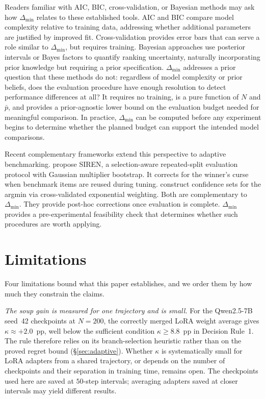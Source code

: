 \documentclass[pdflatex,sn-mathphys-ay,iicol]{sn-jnl}
\theoremstyle{thmstylethree}
\begin{document}
\begin{table}[t]
\begin{table}[t]
Readers familiar with AIC, BIC, cross-validation, or Bayesian methods may ask how $\Delta_{\min}$ relates to these established tools. AIC and BIC compare model complexity relative to training data, addressing whether additional parameters are justified by improved fit. Cross-validation provides error bars that can serve a role similar to $\Delta_{\min}$, but requires training. Bayesian approaches use posterior intervals or Bayes factors to quantify ranking uncertainty, naturally incorporating prior knowledge but requiring a prior specification. $\Delta_{\min}$ addresses a prior question that these methods do not: regardless of model complexity or prior beliefs, does the evaluation procedure have enough resolution to detect performance differences at all? It requires no training, is a pure function of $N$ and $\bar{p}$, and provides a prior-agnostic lower bound on the evaluation budget needed for meaningful comparison. In practice, $\Delta_{\min}$ can be computed before any experiment begins to determine whether the planned budget can support the intended model comparisons.

Recent complementary frameworks extend this perspective to adaptive benchmarking. \citet{xu2026b} propose SIREN, a selection-aware repeated-split evaluation protocol with Gaussian multiplier bootstrap. It corrects for the winner's curse when benchmark items are reused during tuning. \citet{zhang2024winners} construct confidence sets for the argmin via cross-validated exponential weighting. Both are complementary to $\Delta_{\min}$. They provide post-hoc corrections once evaluation is complete. $\Delta_{\min}$ provides a pre-experimental feasibility check that determines whether such procedures are worth applying.

\section{Limitations}\label{sec:limitations}

Four limitations bound what this paper establishes, and we order them by how much they constrain the claims.

\emph{The soup gain is measured for one trajectory and is small.} For the Qwen2.5-7B seed~42 checkpoints at $N=200$, the correctly merged LoRA weight average gives $\kappa \approx +2.0$~pp, well below the sufficient condition $\kappa \geq 8.8$~pp in Decision Rule~1. The rule therefore relies on its branch-selection heuristic rather than on the proved regret bound (\S\ref{sec:adaptive}). Whether $\kappa$ is systematically small for LoRA adapters from a shared trajectory, or depends on the number of checkpoints and their separation in training time, remains open. The checkpoints used here are saved at $50$-step intervals; averaging adapters saved at closer intervals may yield different results.


\end{table}
\end{table}
\end{document}
